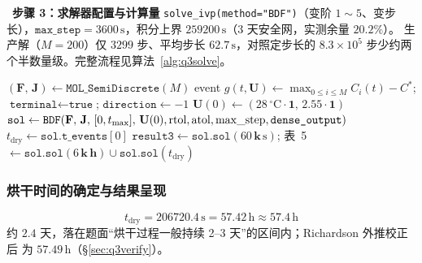 \documentclass[withoutpreface,bwprint]{cumcmthesis} %
\begin{document}
\noindent{}\ \textbf{步骤 3：求解器配置与计算量}
\texttt{solve\_ivp(method="BDF")}（变阶 $1\sim5$、变步长），$\texttt{max\_step}=
3600\,\mathrm{s}$，积分上界 $259200\,\mathrm{s}$（3 天安全网，实测余量 $20.2\%$）。
生产解（$M=200$）仅 $3299$ 步、平均步长 $62.7\,\mathrm{s}$，对照定步长的
$8.3\times10^{5}$ 步少约两个半数量级。完整流程见算法~\ref{alg:q3solve}。

\begin{algorithm}[htbp]
\small
\caption{问题三：线方法 $+$ 自适应 BDF $+$ 终止事件定位}
\label{alg:q3solve}
$(\mathbf{F},\,\mathbf{J})\leftarrow\texttt{MOL\_SemiDiscrete}(M)$
event $g(t,\mathbf{U})\leftarrow\max_{0\le i\le M}C_i(t)-C^{*}$;
$\texttt{terminal}\leftarrow\texttt{true}$; $\texttt{direction}\leftarrow-1$\;
$\mathbf{U}(0)\leftarrow(28\,^\circ\mathrm{C}\cdot\mathbf{1},\,2.55\cdot\mathbf{1})$\;
$\texttt{sol}\leftarrow\texttt{BDF}(\mathbf{F},\,\mathbf{J},\,[0,t_{\max}],\,\mathbf{U}(0),
{\rm rtol},{\rm atol},{\rm max\_step},\texttt{dense\_output})$
$t_{\mathrm{dry}}\leftarrow\texttt{sol.t\_events}[0]$
$\texttt{result3}\leftarrow\texttt{sol.sol}(60\,\mathbf{k}\,\mathrm{s})$;
表~5 $\leftarrow\texttt{sol.sol}(6\,\mathbf{k}\,\mathbf{h})\cup\texttt{sol.sol}(t_{\mathrm{dry}})$\;
\end{algorithm}

\subsubsection{烘干时间的确定与结果呈现}
\label{sec:q3results}

\begin{equation}
\label{eq:q3result}
\boxed{\ t_{\mathrm{dry}}=206720.4\,\mathrm{s}=57.42\,\mathrm{h}\approx57.4\,\mathrm{h}\ }
\end{equation}
约 $2.4$ 天，落在题面``烘干过程一般持续 2--3 天''的区间内；Richardson 外推校正后
为 $57.49\,\mathrm{h}$（\S\ref{sec:q3verify}）。
\end{document}
